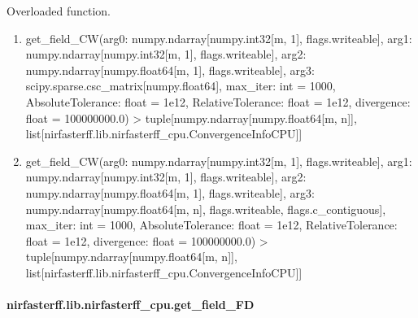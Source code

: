 \documentclass[letterpaper,10pt,english]{sphinxmanual}
\begin{document}
\begin{fulllineitems}
\label{\detokenize{_autosummary/nirfasterff.lib.nirfasterff_cpu.get_field_CW:nirfasterff.lib.nirfasterff_cpu.get_field_CW}}
\pysigstartsignatures
{}
\pysigstopsignatures
\sphinxAtStartPar
Overloaded function.
\begin{enumerate}
%
\item {} 
\sphinxAtStartPar
get\_field\_CW(arg0: numpy.ndarray{[}numpy.int32{[}m, 1{]}, flags.writeable{]}, arg1: numpy.ndarray{[}numpy.int32{[}m, 1{]}, flags.writeable{]}, arg2: numpy.ndarray{[}numpy.float64{[}m, 1{]}, flags.writeable{]}, arg3: scipy.sparse.csc\_matrix{[}numpy.float64{]}, max\_iter: int = 1000, AbsoluteTolerance: float = 1e\sphinxhyphen{}12, RelativeTolerance: float = 1e\sphinxhyphen{}12, divergence: float = 100000000.0) \sphinxhyphen{}\textgreater{} tuple{[}numpy.ndarray{[}numpy.float64{[}m, n{]}{]}, list{[}nirfasterff.lib.nirfasterff\_cpu.ConvergenceInfoCPU{]}{]}

\item {} 
\sphinxAtStartPar
get\_field\_CW(arg0: numpy.ndarray{[}numpy.int32{[}m, 1{]}, flags.writeable{]}, arg1: numpy.ndarray{[}numpy.int32{[}m, 1{]}, flags.writeable{]}, arg2: numpy.ndarray{[}numpy.float64{[}m, 1{]}, flags.writeable{]}, arg3: numpy.ndarray{[}numpy.float64{[}m, n{]}, flags.writeable, flags.c\_contiguous{]}, max\_iter: int = 1000, AbsoluteTolerance: float = 1e\sphinxhyphen{}12, RelativeTolerance: float = 1e\sphinxhyphen{}12, divergence: float = 100000000.0) \sphinxhyphen{}\textgreater{} tuple{[}numpy.ndarray{[}numpy.float64{[}m, n{]}{]}, list{[}nirfasterff.lib.nirfasterff\_cpu.ConvergenceInfoCPU{]}{]}

\end{enumerate}

\end{fulllineitems}


\sphinxstepscope


\paragraph{nirfasterff.lib.nirfasterff\_cpu.get\_field\_FD}
\label{\detokenize{_autosummary/nirfasterff.lib.nirfasterff_cpu.get_field_FD:nirfasterff-lib-nirfasterff-cpu-get-field-fd}}\label{\detokenize{_autosummary/nirfasterff.lib.nirfasterff_cpu.get_field_FD::doc}}
\end{document}
